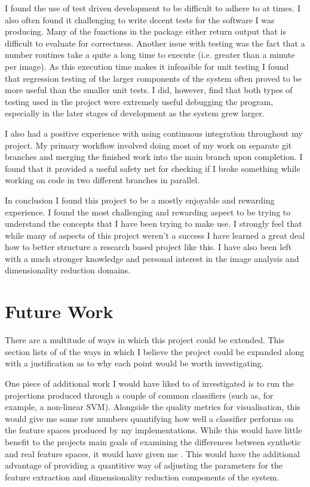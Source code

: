I found the use of test driven development to be difficult to adhere to at times. I also often found it challenging to write decent tests for the software I was producing. Many of the functions in the package either return output that is difficult to evaluate for correctness. Another issue with testing was the fact that a number routines take a quite a long time to execute (i.e. greater than a minute per image). As this execution time makes it infeasible for unit testing I found that regression testing of the larger components of the system often proved to be more useful than the smaller unit tests. I did, however, find that both types of testing used in the project were extremely useful debugging the program, especially in the later stages of development as the system grew larger. 

I also had a positive experience with using continuous integration throughout my project. My primary workflow involved doing most of my work on separate git branches and merging the finished work into the main branch upon completion. I found that it provided a useful safety net for checking if I broke something while working on code in two different branches in parallel.

In conclusion I found this project to be a mostly enjoyable and rewarding experience. I found the most challenging and rewarding aspect to be trying to understand the concepts that I have been trying to make use. I strongly feel that while many of aspects of this project weren't a success I have learned a great deal how to better structure a research based project like this. I have also been left with a much stronger knowledge and personal interest in the image analysis and dimensionality reduction domains.


\section{Future Work}
\label{sec:future-work}
There are a multitude of ways in which this project could be extended. This section lists of of the ways in which I believe the project could be expanded along with a justification as to why each point would be worth investigating.

One piece of additional work I would have liked to of investigated is to run the projections produced through a couple of common classifiers (such as, for example, a non-linear SVM). Alongside the quality metrics for visualisation, this would give me some raw numbers quantifying how well a classifier performs on the feature spaces produced by my implementations. While this would have little benefit to the projects main goals of examining the differences between synthetic and real feature spaces, it would have given me . This would have the additional advantage of providing a quantitive way of adjusting the parameters for the feature extraction and dimensionality reduction components of the system.


